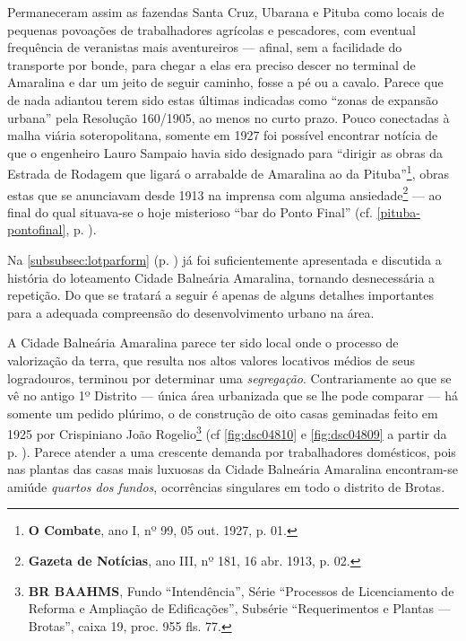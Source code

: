 Permaneceram assim as fazendas Santa Cruz, Ubarana e Pituba como locais de pequenas povoações de trabalhadores agrícolas e pescadores, com eventual frequência de veranistas mais aventureiros --- afinal, sem a facilidade do transporte por bonde, para chegar a elas era preciso descer no terminal de Amaralina e dar um jeito de seguir caminho, fosse a pé ou a cavalo. Parece que de nada adiantou terem sido estas últimas indicadas como ``zonas de expansão urbana'' pela Resolução 160/1905, ao menos no curto prazo. Pouco conectadas à malha viária soteropolitana, somente em 1927 foi possível encontrar notícia de que o engenheiro Lauro Sampaio havia sido designado para ``dirigir as obras da Estrada de Rodagem que ligará o arrabalde de Amaralina ao da Pituba''\footnote{\textbf{O Combate}, ano I, nº 99, 05 out. 1927, p. 01.}, obras estas que se anunciavam desde 1913 na imprensa com alguma ansiedade\footnote{\textbf{Gazeta de Notícias}, ano III, nº 181, 16 abr. 1913, p. 02.} --- ao final do qual situava-se o hoje misterioso ``bar do Ponto Final'' (cf. \autoref{pituba-pontofinal}, p. \pageref{pituba-pontofinal}).

Na \autoref{subsubsec:lotparform} (p. \pageref{subsubsec:lotparform}) já foi suficientemente apresentada e discutida a história do loteamento Cidade Balneária Amaralina, tornando desnecessária a repetição. Do que se tratará a seguir é apenas de alguns detalhes importantes para a adequada compreensão do desenvolvimento urbano na área. 


A Cidade Balneária Amaralina parece ter sido local onde o processo de valorização da terra, que resulta nos altos valores locativos médios de seus logradouros, terminou por determinar uma \textit{segregação}. Contrariamente ao que se vê no antigo 1º Distrito --- única área urbanizada que se lhe pode comparar --- há somente um pedido plúrimo, o de construção de oito casas geminadas feito em 1925 por Crispiniano João Rogelio\footnote{\textbf{BR BAAHMS}, Fundo ``Intendência'', Série ``Processos de Licenciamento de Reforma e Ampliação de Edificações'', Subsérie ``Requerimentos e Plantas --- Brotas'', caixa 19, proc. 955 fls. 77.} (cf \autoref{fig:dsc04810} e \autoref{fig:dsc04809} a partir da p. \pageref{fig:dsc04810}). Parece atender a uma crescente demanda por trabalhadores domésticos, pois nas plantas das casas mais luxuosas da Cidade Balneária Amaralina encontram-se amiúde \textit{quartos dos fundos}, ocorrências singulares em todo o distrito de Brotas.

